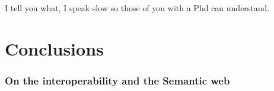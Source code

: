 

\begin{savequote}[50mm]
I tell you what, I speak slow so those of you with a Phd can understand.
\end{savequote}


\chapter{Conclusions}
\label{cha:conclusions}

\ifpdf
    \graphicspath{{5_conclusion/figures/PNG/}{5_conclusion/figures/PDF/}{5_conclusion/figures/}}
\else
    \graphicspath{{5_conclusion/figures/EPS/}{5_conclusion/figures/}}
\fi



\subsection{On the interoperability and the Semantic web}

